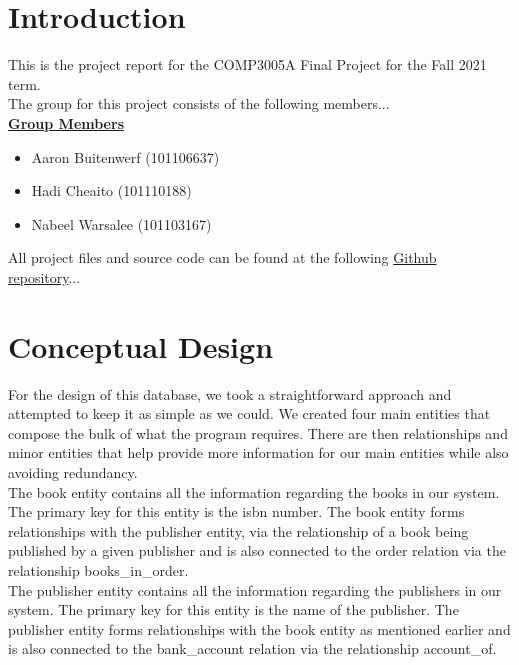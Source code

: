 \documentclass[a4 paper]{article}
\begin{document}

\section*{Introduction}
This is the project report for the COMP3005A Final Project for the Fall 2021 term.\\
The group for this project consists of the following members...\\

\noindent\underline{\textbf{Group Members}}
\begin{itemize}
	\item Aaron Buitenwerf (101106637)
	\item Hadi Cheaito (101110188)
	\item Nabeel Warsalee (101103167)
\end{itemize}

\noindent All project files and source code can be found at the following \href{https://github.com/COMP3005A-Project/bookstore}{Github repository}...

\section{Conceptual Design}
For the design of this database, we took a straightforward approach and attempted to keep it as simple as we could. We created four main entities that compose the bulk of what the program requires. There are then relationships and minor entities that help provide more information for our main entities while also avoiding redundancy.\\

\noindent The book entity contains all the information regarding the books in our system. The primary key for this entity is the isbn number. The book entity forms relationships with the publisher entity, via the relationship of a book being published by a given publisher and is also connected to the order relation via the relationship books\_in\_order.\\

\noindent The publisher entity contains all the information regarding the publishers in our system. The primary key for this entity is the name of the publisher. The publisher entity forms relationships with the book entity as mentioned earlier and is also connected to the bank\_account relation via the relationship account\_of.\\
\end{document}
